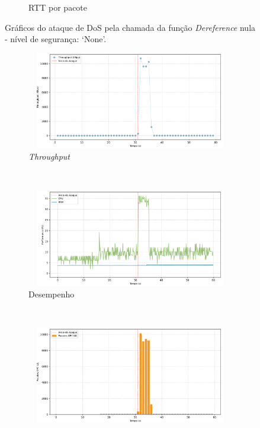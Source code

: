 \begin{apendicesenv}
\begin{figure}[htbp!]
\begin{subfigure}[t]{0.5\textwidth}
        \caption{RTT por pacote}
    \end{subfigure}%
    \label{fig:0-dos_function_call_null_deref}
    \caption{Gráficos do ataque de DoS pela chamada da função \textit{Dereference} nula - nível de segurança: `None'.}
\end{figure}

\begin{figure}[htbp!]
    \centering
    \begin{subfigure}[t]{0.5\textwidth}
        \centering
        \includegraphics[width=1\textwidth, height=120pt]{USPSC-img/output/cropped/1-dos_function_call_null_deref-tput.png}
        \caption{\textit{Throughput}}
    \end{subfigure}%
    ~ 
    \begin{subfigure}[t]{0.5\textwidth}
        \centering
        \includegraphics[width=1\textwidth, height=120pt]{USPSC-img/output/cropped/1-dos_function_call_null_deref-perf.png}
        \caption{Desempenho}
    \end{subfigure}%
    \\
    \begin{subfigure}[t]{0.5\textwidth}
        \centering
        \includegraphics[width=1\textwidth, height=120pt]{USPSC-img/output/cropped/1-dos_function_call_null_deref-pack.png}

\end{subfigure}
\end{figure}
\end{apendicesenv}
